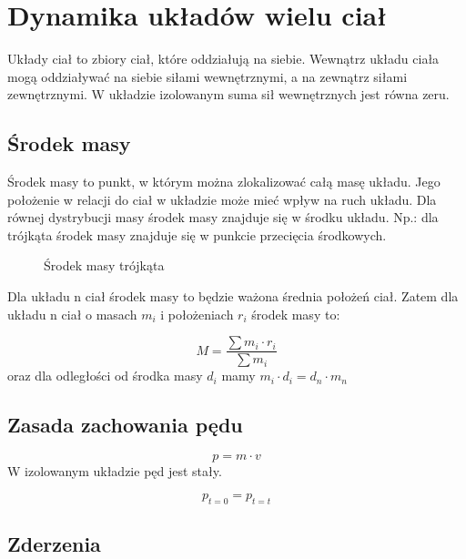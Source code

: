 \documentclass{../notatki}
\begin{document}
\section{Dynamika układów wielu ciał}

Układy ciał to zbiory ciał, które oddziałują na siebie. Wewnątrz układu ciała
mogą oddziaływać na siebie siłami wewnętrznymi, a na zewnątrz siłami
zewnętrznymi. W układzie izolowanym suma sił wewnętrznych jest równa zeru.

\subsection{Środek masy}

Środek masy to punkt, w którym można zlokalizować całą masę układu. Jego
położenie w relacji do ciał w układzie może mieć wpływ na ruch układu.
Dla równej dystrybucji masy środek masy znajduje się w środku układu.
Np.: dla trójkąta środek masy znajduje się w punkcie przecięcia środkowych.

\begin{figure*}[ht]
  \centering
  \caption{Środek masy trójkąta}
\end{figure*}
Dla układu n ciał środek masy to będzie ważona średnia położeń ciał. Zatem dla
układu n ciał o masach $m_i$ i położeniach $r_i$ środek masy to:

$$
M = \frac{\sum m_i \cdot r_i}{\sum m_i}
$$
oraz dla odległości od środka masy $d_i$ mamy $m_i \cdot d_i = d_n \cdot m_n$

\subsection{Zasada zachowania pędu}

$$
p = m \cdot v
$$
W izolowanym układzie pęd jest stały.

$$
p_{t=0} = p_{t=t}
$$

\subsection{Zderzenia}
\end{document}
